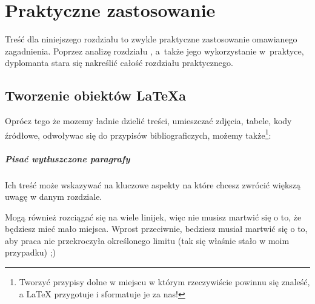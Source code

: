 \chapter{Praktyczne zastosowanie}
\label{chap:praktyczne-zastosowanie}

Treść dla niniejszego rozdziału to zwykle praktyczne zastosowanie omawianego zagadnienia. Poprzez analizę rozdziału , a~także jego wykorzystanie w~praktyce, dyplomanta stara się nakreślić całość rozdziału praktycznego.

\section{Tworzenie obiektów LaTeXa}
\label{sec:tworzenie-obiektow-latexa}
Oprócz tego że mozemy ładnie dzielić treści, umieszczać zdjęcia, tabele, kody źródłowe, odwoływac się do przypisów bibliograficzych, możemy także\footnote{Tworzyć przypisy dolne w miejscu w którym rzeczywiście powinnu się znaleść, a LaTeX przygotuje i sformatuje je za nas!}:


\paragraph{Pisać wytłuszczone paragrafy} Ich treść może wskazywać na kluczowe aspekty na które chcesz zwrócić większą uwagę w danym rozdziale.

Mogą również rozciągać się na wiele linijek, więc nie musisz martwić się o to, że będziesz mieć mało miejsca. Wprost przeciwnie, bedziesz musiał martwić się o to, aby praca nie przekroczyła określonego limitu (tak się właśnie stało w moim przypadku) ;)

